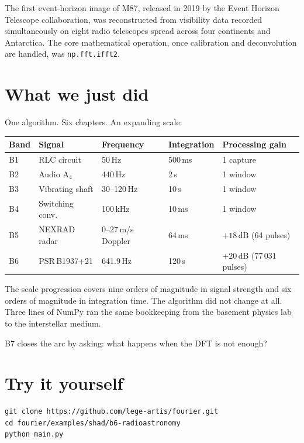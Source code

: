 \documentclass[11pt,a4paper,openany]{book}
\begin{document}
The first event-horizon image of M87, released in 2019 by the Event Horizon
Telescope collaboration, was reconstructed from visibility data recorded
simultaneously on eight radio telescopes spread across four continents and
Antarctica. The core mathematical operation, once calibration and
deconvolution are handled, was \texttt{np.fft.ifft2}.

\section{What we just did}

One algorithm. Six chapters. An expanding scale:

\medskip
\begin{longtable}{p{1.5cm}p{3.0cm}p{2.0cm}p{2.2cm}p{4.0cm}}
\toprule
\textbf{Band} & \textbf{Signal} & \textbf{Frequency}
  & \textbf{Integration} & \textbf{Processing gain} \\
\midrule
\endhead
B1 & RLC circuit & 50\,Hz & 500\,ms & 1 capture \\
B2 & Audio A$_4$ & 440\,Hz & 2\,s & 1 window \\
B3 & Vibrating shaft & 30--120\,Hz & 10\,s & 1 window \\
B4 & Switching conv.\ & 100\,kHz & 10\,ms & 1 window \\
B5 & NEXRAD radar & 0--27\,m/s Doppler & 64\,ms & $+18$\,dB (64 pulses) \\
B6 & PSR\,B1937+21 & 641.9\,Hz & 120\,s & $+20$\,dB (77\,031 pulses) \\
\bottomrule
\end{longtable}
\medskip

The scale progression covers nine orders of magnitude in signal strength and
six orders of magnitude in integration time. The algorithm did not change at
all. Three lines of NumPy ran the same bookkeeping from the basement physics
lab to the interstellar medium.

B7 closes the arc by asking: what happens when the DFT is not enough?

\section{Try it yourself}

\begin{lstlisting}[style=shaddata]
git clone https://github.com/lege-artis/fourier.git
cd fourier/examples/shad/b6-radioastronomy
python main.py
\end{lstlisting}
\end{document}
